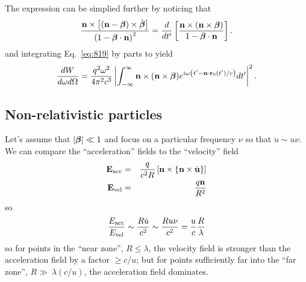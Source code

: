 The expression can be simplied further by noticing that
\begin{equation}
\frac{{\bf n} \times \left [  ({\bf n} - \mbox{\boldmath $\beta$} ) \times
    \dot{\mbox{\boldmath $\beta$}} \right ]}{\left ( 1-\mbox{\boldmath $\beta$}\cdot {\bf n} \right
  )^2}
= \frac{d}{d t'} \left [ \frac{{\bf n} \times ({\bf n} \times
    \mbox{\boldmath $\beta$} ) }{1-\mbox{\boldmath $\beta$}\cdot {\bf n}} \right ].
\label{eq:820}
\end{equation}
and integrating Eq.~\ref{eq:819} by parts to yield
\begin{equation}
\frac{d W}{d\omega d\Omega} = \frac{q^2 \omega^2}{4\pi^2 c^3} 
\left | \int_{-\infty}^\infty {\bf n} \times ({\bf n} \times \mbox{\boldmath $\beta$}) e^{i
  \omega \left ( t'-{\bf n} \cdot {\bf r}_0 (t') / c \right )} dt'
\right |^2.
\label{eq:204}
\end{equation}

\subsection{Non-relativistic particles}
\label{sec:non-relat-part}

Let's assume that $|\mbox{\boldmath $\beta$}| \ll 1$ and focus on a particular
frequency $\nu$ so that ${\dot u} \sim u \nu$.  We can compare the
``acceleration'' fields to the ``velocity'' field
\begin{eqnarray}
{\bf E}_{\hbox{\rm \scriptsize acc}} &=& \frac{q}{c^2 R} \left [ {\bf n} \times
    \left \{ {\bf n} \times \dot{\bf u} \right \} \right ] 
    \\
{\bf E}_{\hbox{\rm \scriptsize vel}} &=& \frac{q {\bf n}}{R^2}
\label{eq:205}
\end{eqnarray}
so
\begin{equation}
\frac{E_{\hbox{\rm \scriptsize acc}}}{E_{\hbox{\rm \scriptsize vel}}} \sim \frac{R \dot{u}}{c^2} \sim
\frac{R u \nu}{c^2} = \frac{u}{c} \frac{R}{\lambda}
\label{eq:206}
\end{equation}
so for points in the ``near zone'', $R\leq \lambda$, the velocity
field is stronger than the acceleration field by a factor $\geq c/u$; but
for points sufficiently far into the ``far zone'', $R\gg\ \lambda
(c/u)$, the acceleration field dominates.

